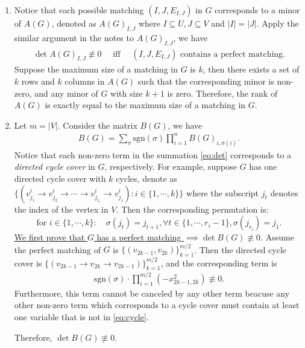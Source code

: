 \begin{answer}
	\begin{enumerate}[label=\alph*).]
		\item Notice that each possible matching $(I, J, E_{I,J})$ in $G$ corresponds to a minor of $A(G)$, denoted as $A(G)_{I,J}$ where $I\subseteq U, J\subseteq V$ and $|I|=|J|$. 
		Apply the similar argument in the notes to $A(G)_{I,J}$, we have 
		\begin{align*}
			\det A(G)_{I,J} \not \equiv 0 \quad \text{ iff } \quad \text{$(I, J, E_{I,J})$ contains a perfect matching.}
		\end{align*}
		Suppose the maximum size of a matching in $G$ is $k$, then there exists a set of $k$ rows and $k$ columns in $A(G)$ such that the corresponding minor is non-zero, and any minor of $G$ with size $k+1$ is zero. Therefore, the rank of $A(G)$ is exactly equal to the maximum size of a matching in $G$.
		\item Let $m = |V|$. Consider the matrix $B(G)$, we have
		\begin{align}
			\label{eq:det}
			B(G) = \sum_{\sigma} \text{sgn}(\sigma) \prod_{i=1}^{n} B(G)_{i, \sigma(i)}. 
		\end{align}
		Notice that each non-zero term in the summation \eqref{eq:det} corresponds to a \textit{directed cycle cover} in $G$, respectively.
		For example, suppose $G$ has one directed cycle cover with $k$ cycles, denote as $\{(v_{j_1}^i \to v_{j_2}^i \to \cdots \to v_{j_{r_i}}^i \to v_{j_1}^i): i\in \{1,\cdots,k\}\}$ where the subscript $j_t$ denotes the index of the vertex in $V$.
		Then the corresponding permutation is:    
		\[
			\text{for } i \in \{1, \cdots, k\}:\quad \sigma(j_t) = j_{t+1}, \forall t\in \{1,\cdots,r_i-1\}, \sigma(j_{r_i}) = j_1. 
		\]
		\underline{We first prove that $G$ has a perfect matching $\implies \det B(G) \not\equiv 0$}. 
		Assume the perfect matching of $G$ is $\{(v_{2k-1}, v_{2k})\}_{k=1}^{m/2}$. 
		Then the directed cycle cover is $\{(v_{2k-1} \to v_{2k} \to v_{2k-1})\}_{k=1}^{m/2}$, 
		and the corresponding term is 
		\begin{align}
			\label{eq:cycle}
			\text{sgn}(\sigma)\cdot \prod_{i=1}^{m/2} \left(-x_{2k-1, 2k}^2\right) \not\equiv 0.
		\end{align}		
		Furthermore, this term cannot be canceled by any other term 
		beacuse any other non-zero term which corresponds to a cycle cover 
		must contain at least one variable that is not in \eqref{eq:cycle}.
		
		Therefore, $\det B(G) \not\equiv 0$.


\end{enumerate}
\end{answer}
